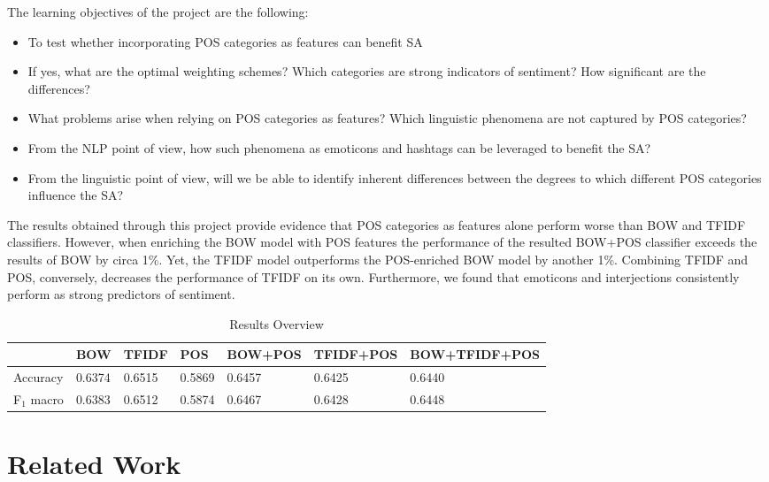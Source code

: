 \documentclass[titlepage]{article}
\begin{document}
The learning objectives of the project are the following:
\begin{itemize}
\item To test whether incorporating POS categories as features can benefit SA
\item  If yes, what are the optimal weighting schemes? Which categories are strong indicators of sentiment? How significant are the differences?
\item What problems arise when relying on POS categories as features? Which linguistic phenomena are not captured by POS categories?
\item From the NLP point of view, how such phenomena as emoticons and hashtags can be leveraged to benefit the SA?
\item From the linguistic point of view, will we be able to identify inherent differences between the degrees to which different POS categories influence the SA?
\end{itemize}


The results obtained through this project provide evidence that POS categories as features alone perform worse than BOW and TFIDF classifiers. However, when enriching the BOW model with POS features the performance of the resulted BOW+POS classifier exceeds the results of BOW by circa 1\%. Yet, the TFIDF model outperforms the POS-enriched BOW model by another 1\%. Combining TFIDF and POS, conversely, decreases the performance of TFIDF on its own. Furthermore, we found that emoticons and interjections consistently perform as strong predictors of sentiment. 

\begin{table}[h!]
       \centering
   \begin{tabular}{@{}lllllll@{}}
   \toprule
         & BOW & TFIDF  & POS & BOW+POS & TFIDF+POS & BOW+TFIDF+POS \\ 
             \midrule
Accuracy & 0.6374 & 0.6515 & 0.5869 & 0.6457 & 0.6425  & 0.6440        \\ 
F$_{1}$ macro & 0.6383 & 0.6512 & 0.5874 & 0.6467 & 0.6428  & 0.6448        \\ 
    \bottomrule
\end{tabular}
\caption{Results Overview}
\label{results_overview}
\end{table}


\section{Related Work}
      
\end{document}
